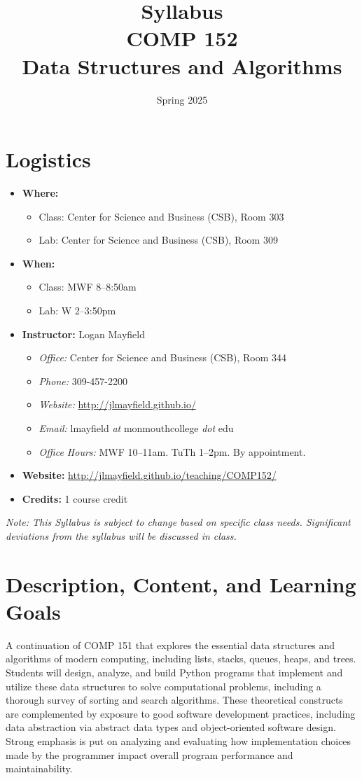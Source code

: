 \documentclass[10pt]{article}
\title{Syllabus \\ COMP 152 \\ Data Structures and Algorithms}
\author{  }
\date{Spring 2025}
\begin{document}
\maketitle

\section{Logistics}
\begin{itemize}
\item \textbf{Where: }
\begin{itemize}
\item Class: Center for Science and Business (CSB), Room 303
\item Lab: Center for Science and Business (CSB), Room 309
\end{itemize}
\item \textbf{When: }
\begin{itemize}
  \item Class: MWF 8--8:50am
  \item Lab: W 2--3:50pm
\end{itemize}
\item \textbf{Instructor: } Logan Mayfield
\begin{itemize}
\item \textit{Office: } Center for Science and Business (CSB), Room 344
\item \textit{Phone: } 309-457-2200 %
\item \textit{Website: } \url{http://jlmayfield.github.io/}
\item \textit{Email: } lmayfield \textit{at} monmouthcollege \textit{dot} edu
\item \textit{Office Hours: }  MWF 10--11am. TuTh 1--2pm. By appointment.
\end{itemize}
\item \textbf{Website: } \url{http://jlmayfield.github.io/teaching/COMP152/}
\item \textbf{Credits: } 1 course credit
\end{itemize}
\emph{Note: This Syllabus is subject to change based on specific class needs. Significant deviations from the syllabus will be discussed in class.}


\section{Description, Content, and Learning Goals}

A continuation of COMP 151 that explores the essential data structures
and algorithms of modern computing, including lists, stacks, queues,
heaps, and trees. Students will design, analyze, and build Python
programs that implement and utilize these data structures to solve
computational problems, including a thorough survey of sorting and
search algorithms. These theoretical constructs are complemented by
exposure to good software development practices, including data
abstraction via abstract data types and object-oriented software
design. Strong emphasis is put on analyzing and evaluating how
implementation choices made by the programmer impact overall program
performance and maintainability.
\end{document}

